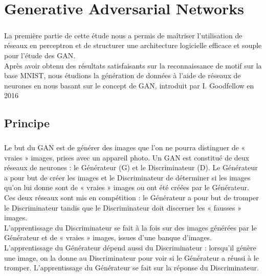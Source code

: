 



\chapter{Generative Adversarial Networks}

\paragraph{}
La première partie de cette étude nous a permis de maîtriser l'utilisation de réseaux en perceptron et de structurer une architecture logicielle efficace et souple pour l'étude des GAN. \\
Après avoir obtenu des résultats satisfaisants sur la reconnaissance de motif sur la base MNIST, nous étudions la génération de données à l'aide de réseaux de neurones en nous basant sur le concept de GAN, introduit par I. Goodfellow en 2016 \cite{nips-2014}
\section{Principe}
\paragraph{}
Le but du GAN est de générer des images que l’on ne pourra distinguer de « vraies » images, prises avec un appareil photo. Un GAN est constitué de deux réseaux de neurones : le Générateur (G) et le Discriminateur (D). Le Générateur a pour but de créer les images et le Discriminateur de déterminer si les images qu’on lui donne sont de « vraies » images ou ont été créées par le Générateur. Ces deux réseaux sont mis en compétition : le Générateur a pour but de tromper le Discriminateur tandis que le Discriminateur doit discerner les « fausses » images.\\
L’apprentissage du Discriminateur se fait à la fois sur des images générées par le Générateur et de « vraies » images, issues d’une banque d’images.\\
L’apprentissage du Générateur dépend aussi du Discriminateur : lorsqu’il génère une image, on la donne au Discriminateur pour voir si le Générateur a réussi à le tromper. L’apprentissage du Générateur se fait sur la réponse du Discriminateur.

